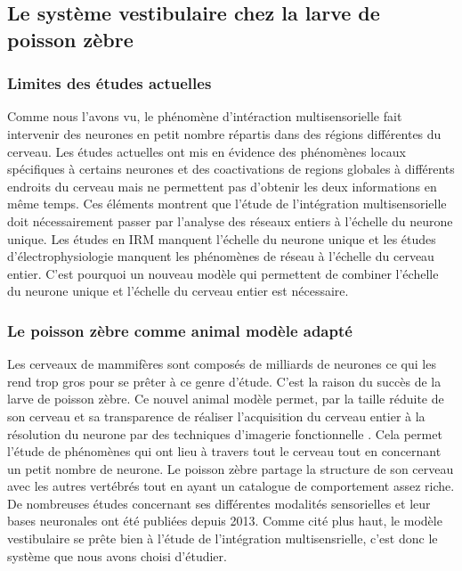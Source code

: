 
\subsection{Le système vestibulaire chez la larve de poisson zèbre}

\subsubsection{Limites des études actuelles}

Comme nous l'avons vu, le phénomène d'intéraction multisensorielle fait intervenir des neurones en petit nombre répartis dans des régions différentes du cerveau. Les études actuelles ont mis en évidence des phénomènes locaux spécifiques à certains neurones et des coactivations de regions globales à différents endroits du cerveau mais ne permettent pas d'obtenir les deux informations en même temps. 
Ces éléments montrent que l'étude de l'intégration multisensorielle doit nécessairement passer par l'analyse des réseaux entiers à l'échelle du neurone unique. Les études en IRM manquent l'échelle du neurone unique et les études d'électrophysiologie manquent les phénomènes de réseau à l'échelle du cerveau entier. C'est pourquoi un nouveau modèle qui permettent de combiner l'échelle du neurone unique et l'échelle du cerveau entier est nécessaire.

\subsubsection{Le poisson zèbre comme animal modèle adapté}

Les cerveaux de mammifères sont composés de milliards de neurones ce qui les rend trop gros pour se prêter à ce genre d'étude. C'est la raison du succès de la larve de poisson zèbre. Ce nouvel animal modèle permet, par la taille réduite de son cerveau et sa transparence de réaliser l'acquisition du cerveau entier à la résolution du neurone par des techniques d'imagerie fonctionnelle \cite{panier_fast_2013}. Cela permet l'étude de phénomènes qui ont lieu à travers tout le cerveau tout en concernant un petit nombre de neurone. Le poisson zèbre partage la structure de son cerveau avec les autres vertébrés tout en ayant un catalogue de comportement assez riche. De nombreuses études concernant ses différentes modalités sensorielles et leur bases neuronales ont été publiées depuis 2013. Comme cité plus haut, le modèle vestibulaire se prête bien à l'étude de l'intégration multisensrielle, c'est donc le système que nous avons choisi d'étudier.

